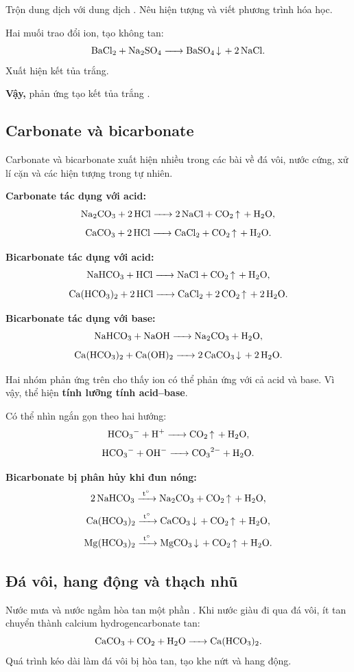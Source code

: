 \begin{vidu}
Trộn dung dịch  với dung dịch . Nêu hiện tượng và viết phương trình hóa học.
\end{vidu}
\begin{loigiai}
Hai muối trao đổi ion, tạo  không tan:
\[
\ce{BaCl2 + Na2SO4 -> BaSO4 v + 2NaCl}.
\]
Xuất hiện kết tủa trắng.

\textbf{Vậy,} phản ứng tạo kết tủa trắng .
\end{loigiai}

\subsection{Carbonate và bicarbonate}

Carbonate và bicarbonate xuất hiện nhiều trong các bài về đá vôi, nước cứng, xử lí cặn và các hiện tượng trong tự nhiên.

\textbf{Carbonate tác dụng với acid:}
\[
\ce{Na2CO3 + 2HCl -> 2NaCl + CO2 ^ + H2O},
\]
\[
\ce{CaCO3 + 2HCl -> CaCl2 + CO2 ^ + H2O}.
\]

\textbf{Bicarbonate tác dụng với acid:}
\[
\ce{NaHCO3 + HCl -> NaCl + CO2 ^ + H2O},
\]
\[
\ce{Ca(HCO3)2 + 2HCl -> CaCl2 + 2CO2 ^ + 2H2O}.
\]

\textbf{Bicarbonate tác dụng với base:}
\[
\ce{NaHCO3 + NaOH -> Na2CO3 + H2O},
\]
\[
\ce{Ca(HCO3)2 + Ca(OH)2 -> 2CaCO3 v + 2H2O}.
\]

Hai nhóm phản ứng trên cho thấy ion  có thể phản ứng với cả acid và base. Vì vậy,  thể hiện \textbf{tính lưỡng tính acid--base}.

Có thể nhìn ngắn gọn theo hai hướng:
\[
\ce{HCO3- + H+ -> CO2 ^ + H2O},
\]
\[
\ce{HCO3- + OH- -> CO3^2- + H2O}.
\]

\textbf{Bicarbonate bị phân hủy khi đun nóng:}
\[
\ce{2NaHCO3 ->[t^\circ] Na2CO3 + CO2 ^ + H2O},
\]
\[
\ce{Ca(HCO3)2 ->[t^\circ] CaCO3 v + CO2 ^ + H2O},
\]
\[
\ce{Mg(HCO3)2 ->[t^\circ] MgCO3 v + CO2 ^ + H2O}.
\]

\subsection{Đá vôi, hang động và thạch nhũ}

Nước mưa và nước ngầm hòa tan một phần . Khi nước giàu  đi qua đá vôi,  ít tan chuyển thành calcium hydrogencarbonate tan:
\[
\ce{CaCO3 + CO2 + H2O -> Ca(HCO3)2}.
\]
Quá trình kéo dài làm đá vôi bị hòa tan, tạo khe nứt và hang động.

